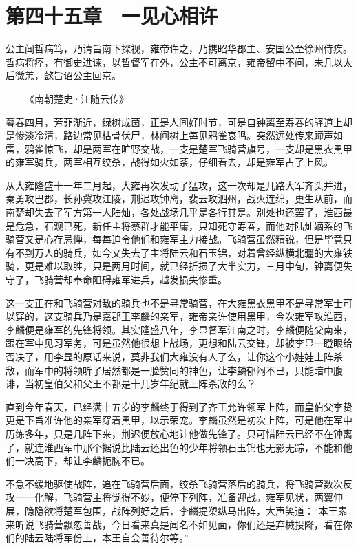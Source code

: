 \chapter{第四十五章　一见心相许}

公主闻哲病笃，乃请旨南下探视，雍帝许之，乃携昭华郡主、安国公至徐州侍疾。哲病将痊，有御史进谏，以哲督军在外，公主不可离京，雍帝留中不问，未几以太后微恙，懿旨诏公主回京。

——《南朝楚史·江随云传》

暮春四月，芳菲渐近，绿树成茵，正是人间好时节，可是自钟离至寿春的驿道上却是惨淡冷清，路边常见枯骨伏尸，林间树上每见鸦雀哀鸣。突然远处传来蹄声如雷，鸦雀惊飞，却是两军在旷野交战，一支是楚军飞骑营旗号，一支却是黑衣黑甲的雍军骑兵，两军相互绞杀，战得如火如荼，仔细看去，却是雍军占了上风。

从大雍隆盛十一年二月起，大雍再次发动了猛攻，这一次却是几路大军齐头并进，秦勇攻巴郡，长孙冀攻江陵，荆迟攻钟离，裴云攻泗州，战火连绵，更生从前，而南楚却失去了军方第一人陆灿，各处战场几乎是各行其是。别处也还罢了，淮西最是危急，石观已死，新任主将蔡群才能平庸，只知死守寿春，而他对陆灿嫡系的飞骑营又是心存忌惮，每每迫令他们和雍军主力接战。飞骑营虽然精锐，但是毕竟只有不到万人的骑兵，如今又失去了主将陆云和石玉锦，对着曾经纵横北疆的大雍铁骑，更是难以取胜，只是两月时间，就已经折损了大半实力，三月中旬，钟离便失守了，飞骑营却奉命阻碍雍军进兵，越发损失惨重。

这一支正在和飞骑营对敌的骑兵也不是寻常骑营，在大雍黑衣黑甲不是寻常军士可以穿的，这支骑兵乃是嘉郡王李麟的亲军，雍帝亲许使用黑甲，今次雍军攻淮西，李麟便是雍军的先锋将领。其实隆盛八年，李显督军江南之时，李麟便随父南来，跟在军中见习军务，可是虽然他很想上战场，更想和陆云交锋，却被李显一瞪眼给否决了，用李显的原话来说，莫非我们大雍没有人了么，让你这个小娃娃上阵杀敌，而军中的将领听了居然都是一脸赞同的神色，让李麟郁闷不已，只能暗中腹诽，当初皇伯父和父王不都是十几岁年纪就上阵杀敌的么？

直到今年春天，已经满十五岁的李麟终于得到了齐王允许领军上阵，而皇伯父李贽更是下旨准许他的亲军穿着黑甲，以示荣宠。李麟虽然是初次上阵，可是他在军中历练多年，只是几阵下来，荆迟便放心地让他做先锋了。只可惜陆云已经不在钟离了，就连淮西军中那个据说比陆云还出色的少年将领石玉锦也无影无踪，不能和他们一决高下，却让李麟扼腕不已。

不急不缓地驱使战阵，追在飞骑营后面，绞杀飞骑营落后的骑兵，将飞骑营数次反攻一一化解，飞骑营主将觉得不妙，便停下列阵，准备迎战。雍军见状，两翼伸展，隐隐欲将楚军包围，战阵列好之后，李麟提槊纵马出阵，大声笑道：“本王素来听说飞骑营飘忽善战，今日看来真是闻名不如见面，你们还是弃械投降，看在你们的陆云陆将军份上，本王自会善待尔等。”

